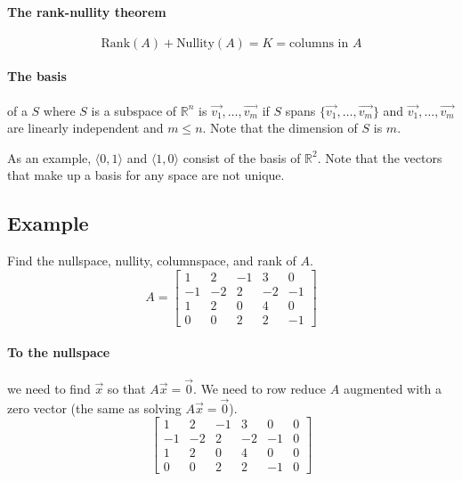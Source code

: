 \documentclass{article}
\begin{document}
\paragraph{The rank-nullity theorem}
$$
\text{Rank}(A) + \text{Nullity}(A) = K = \text{columns in } A
$$

\paragraph{The basis} of a $S$ where $S$ is a subspace of $\mathbb{R}^n$ is $\vec{v_1}, \ldots, \vec{v_m}$ if $S$ spans $\{ \vec{v_1}, \ldots, \vec{v_m} \}$ and $\vec{v_1}, \ldots, \vec{v_m}$ are linearly independent and $m \leq n$. Note that the dimension of $S$ is $m$.

As an example, $\langle 0, 1 \rangle$ and $\langle 1, 0 \rangle$ consist of the basis of $\mathbb{R}^2$. Note that the vectors that make up a basis for any space are not unique.

\subsection{Example}
Find the nullspace, nullity, columnspace, and rank of $A$.
$$
A = \begin{bmatrix}
    1 & 2 & -1 & 3 & 0 \\
    -1 & -2 & 2 & -2 & -1 \\
    1 & 2 & 0 & 4 & 0 \\
    0 & 0 & 2 & 2 & -1
\end{bmatrix}
$$

\paragraph{To the nullspace} we need to find $\vec{x}$ so that $A\vec{x} = \vec{0}$. We need to row reduce $A$ augmented with a zero vector (the same as solving $A\vec{x} = \vec{0}$).
$$
\begin{bmatrix}
    1 & 2 & -1 & 3 & 0 & 0\\
    -1 & -2 & 2 & -2 & -1 & 0\\
    1 & 2 & 0 & 4 & 0 & 0\\
    0 & 0 & 2 & 2 & -1 & 0
\end{bmatrix}
$$
\end{document}
